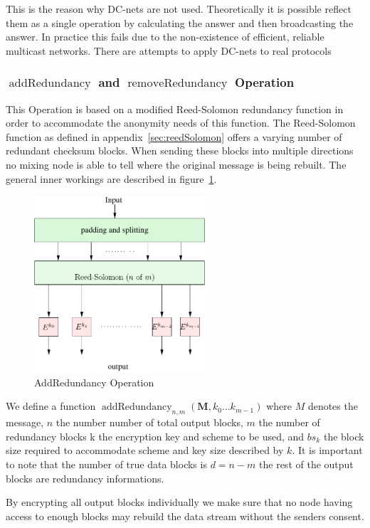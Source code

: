 \documentclass[9pt,journal,compsoc]{IEEEtran}
\DeclareMathOperator{\addRedundancy}{addRedundancy}
\DeclareMathOperator{\removeRedundancy}{removeRedundancy}
\begin{document}
This is the reason why DC-nets are not used. Theoretically it is possible reflect them as a single operation by calculating the answer and then broadcasting the answer. In practice this fails due to the non-existence of efficient, reliable multicast networks. There are attempts to apply DC-nets to real protocols \cite{Corrigan-Gibbs:2010:DAA:1866307.1866346}

\subsubsection{$\addRedundancy$ and $\removeRedundancy$ Operation}
This Operation is based on a modified Reed-Solomon redundancy function in order to accommodate the anonymity needs of this function. The Reed-Solomon function as defined in appendix~\ref{sec:reedSolomon} offers a varying number of redundant checksum blocks. When sending these blocks into multiple directions no mixing node is able to tell where the original message is being rebuilt. The general inner workings are described in figure~\ref{fig:addRedundancy}.

\begin{figure}[!t]
	\centering
	\includegraphics[width=2.5in]{../inc/addRedundancyOp}
	\caption{AddRedundancy Operation}
	\label{fig:addRedundancy}
\end{figure}

We define a function $\addRedundancy_{n,m}( \mathbf{M},k_0\ldots k_{m-1} )$ where $M$ denotes the message, $n$ the number number of total output blocks, $m$ the number of redundancy blocks k the encryption key and scheme to be used, and $bs_k$ the block size required to accommodate scheme and key size described by $k$. It is important to note that the number of true data blocks is $d=n-m$ the rest of the output blocks are redundancy informations.

By encrypting all output blocks individually we make sure that no node having access to enough blocks may rebuild the data stream without the senders consent.
\end{document}
